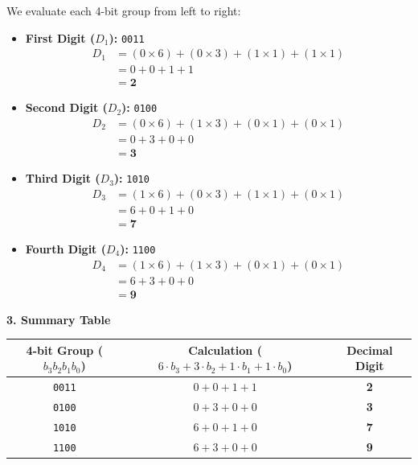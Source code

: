 \documentclass[12pt,a3paper]{article}
\begin{document}
\begin{enumerate}
\begin{tcolorbox}[enhanced,breakable,ansbox,colback=cD!4,colframe=cD,boxrule=0.8pt,arc=5pt,title={\textbf{Answer}},fonttitle=\bfseries\color{white},colbacktitle=cD]
We evaluate each 4-bit group from left to right:

\begin{itemize}
    \item \textbf{First Digit ($D_1$):} \texttt{0011}
    \begin{align*}
        D_1 &= (0 \times 6) + (0 \times 3) + (1 \times 1) + (1 \times 1) \\
            &= 0 + 0 + 1 + 1 \\
            &= \mathbf{2}
    \end{align*}

    \item \textbf{Second Digit ($D_2$):} \texttt{0100}
    \begin{align*}
        D_2 &= (0 \times 6) + (1 \times 3) + (0 \times 1) + (0 \times 1) \\
            &= 0 + 3 + 0 + 0 \\
            &= \mathbf{3}
    \end{align*}

    \item \textbf{Third Digit ($D_3$):} \texttt{1010}
    \begin{align*}
        D_3 &= (1 \times 6) + (0 \times 3) + (1 \times 1) + (0 \times 1) \\
            &= 6 + 0 + 1 + 0 \\
            &= \mathbf{7}
    \end{align*}

    \item \textbf{Fourth Digit ($D_4$):} \texttt{1100}
    \begin{align*}
        D_4 &= (1 \times 6) + (1 \times 3) + (0 \times 1) + (0 \times 1) \\
            &= 6 + 3 + 0 + 0 \\
            &= \mathbf{9}
    \end{align*}
\end{itemize}

\vspace{0.5em}
\textbf{\textcolor{cD}{3. Summary Table}}

\begin{center}
\renewcommand{\arraystretch}{1.2}
\begin{tabular}{ccc}
\toprule
\textbf{4-bit Group ($b_3 b_2 b_1 b_0$)} & \textbf{Calculation ($6\cdot b_3 + 3\cdot b_2 + 1\cdot b_1 + 1\cdot b_0$)} & \textbf{Decimal Digit} \\
\midrule
\texttt{0011} & $0 + 0 + 1 + 1$ & \textbf{2} \\
\texttt{0100} & $0 + 3 + 0 + 0$ & \textbf{3} \\
\texttt{1010} & $6 + 0 + 1 + 0$ & \textbf{7} \\
\texttt{1100} & $6 + 3 + 0 + 0$ & \textbf{9} \\
\bottomrule
\end{tabular}
\end{center}


\end{tcolorbox}
\end{enumerate}
\end{document}
